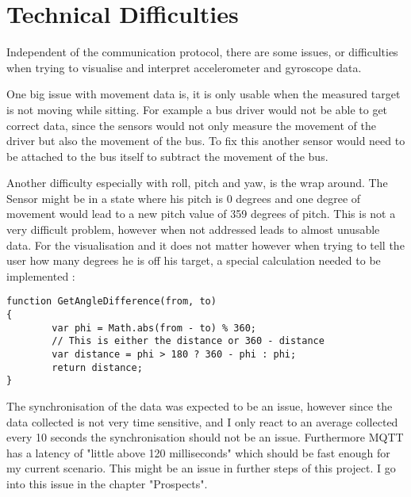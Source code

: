 \section{Technical Difficulties}

Independent of the communication protocol, there are some issues, or difficulties when trying to visualise and interpret accelerometer and gyroscope data.  

One big issue with movement data is, it is only usable when the measured target is not moving while sitting. For example a bus driver would not be able to get correct data, since the sensors would not only measure the movement of the driver but also the movement of the bus. To fix this another sensor would need to be attached to the bus itself to subtract the movement of the bus. 

Another difficulty especially with roll, pitch and yaw, is the wrap around. The Sensor might be in a state where his pitch is 0 degrees and one degree of movement would lead to a new pitch value of 359 degrees of pitch. This is not a very difficult problem, however when not addressed leads to almost unusable data. 
For the visualisation and it does not matter however when trying to tell the user how many degrees he is off his target, a special calculation needed to be implemented \cite{javaHowd16:online}:

\begin{lstlisting}
function GetAngleDifference(from, to)
{
        var phi = Math.abs(from - to) % 360;
        // This is either the distance or 360 - distance
        var distance = phi > 180 ? 360 - phi : phi;
        return distance;
}
\end{lstlisting}

The synchronisation of the data was expected to be an issue, however since the data collected is not very time sensitive, and I only react to an average collected every 10 seconds the synchronisation should not be an issue. Furthermore MQTT has a latency of "little above 120 milliseconds" \cite{Measurin4:online} which should be fast enough for my current scenario. This might be an issue in further steps of this project. I go into this issue in the chapter "Prospects".